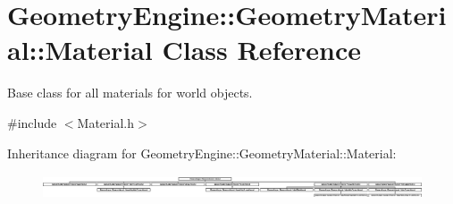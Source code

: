 \hypertarget{class_geometry_engine_1_1_geometry_material_1_1_material}{}\section{Geometry\+Engine\+::Geometry\+Material\+::Material Class Reference}
\label{class_geometry_engine_1_1_geometry_material_1_1_material}


Base class for all materials for world objects.  




{\ttfamily \#include $<$Material.\+h$>$}

Inheritance diagram for Geometry\+Engine\+::Geometry\+Material\+::Material\+:\begin{figure}[H]
\begin{center}
\leavevmode
\includegraphics[height=0.730594cm]{class_geometry_engine_1_1_geometry_material_1_1_material}
\end{center}
\end{figure}
